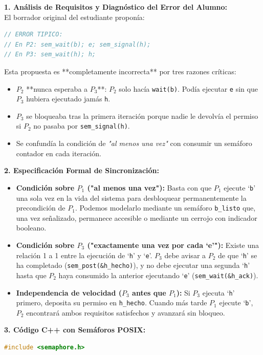 \documentclass[11pt,a4paper,twoside,openright]{report}
\begin{document}
\begin{solucion}
\textbf{1. Análisis de Requisitos y Diagnóstico del Error del Alumno:}\\
El borrador original del estudiante proponía:
\begin{lstlisting}[language=C++]
// ERROR TIPICO:
// En P2: sem_wait(b); e; sem_signal(h);
// En P3: sem_wait(h); h;
\end{lstlisting}
Esta propuesta es **completamente incorrecta** por tres razones críticas:
\begin{itemize}
    \item $P_2$ **nunca esperaba a $P_3$**: $P_2$ solo hacía \texttt{wait(b)}. Podía ejecutar \texttt{e} sin que $P_3$ hubiera ejecutado jamás \texttt{h}.
    \item $P_3$ se bloqueaba tras la primera iteración porque nadie le devolvía el permiso si $P_2$ no pasaba por \texttt{sem\_signal(h)}.
    \item Se confundía la condición de \textit{"al menos una vez"} con consumir un semáforo contador en cada iteración.
\end{itemize}

\textbf{2. Especificación Formal de Sincronización:}
\begin{itemize}
    \item \textbf{Condición sobre $P_1$ ("al menos una vez"):} Basta con que $P_1$ ejecute `\texttt{b}' una sola vez en la vida del sistema para desbloquear permanentemente la precondición de $P_1$. Podemos modelarlo mediante un semáforo \texttt{b\_listo} que, una vez señalizado, permanece accesible o mediante un cerrojo con indicador booleano.
    \item \textbf{Condición sobre $P_3$ ("exactamente una vez por cada `e'"):} Existe una relación 1 a 1 entre la ejecución de `\texttt{h}' y `\texttt{e}'. $P_3$ debe avisar a $P_2$ de que `\texttt{h}' se ha completado (\texttt{sem\_post(\&h\_hecho)}), y no debe ejecutar una segunda `\texttt{h}' hasta que $P_2$ haya consumido la anterior ejecutando `\texttt{e}' (\texttt{sem\_wait(\&h\_ack)}).
    \item \textbf{Independencia de velocidad ($P_3$ antes que $P_1$):} Si $P_3$ ejecuta `\texttt{h}' primero, deposita su permiso en \texttt{h\_hecho}. Cuando más tarde $P_1$ ejecute `\texttt{b}', $P_2$ encontrará ambos requisitos satisfechos y avanzará sin bloqueo.
\end{itemize}

\textbf{3. Código C++ con Semáforos POSIX:}
\begin{lstlisting}[language=C++]
#include <semaphore.h>


\end{lstlisting}
\end{solucion}
\end{document}
